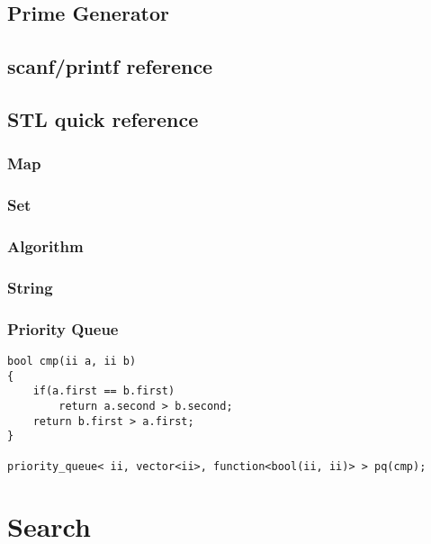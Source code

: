 \documentclass[10pt,oneside]{article}
\begin{document}
\begin{landscape}
\begin{multicols}{2}


\subsection{Prime Generator}


\subsection{scanf/printf reference}


\subsection{STL quick reference}

\subsubsection{Map}


\subsubsection{Set}


\subsubsection{Algorithm}


\subsubsection{String}

\subsubsection{Priority Queue}

\begin{lstlisting}
bool cmp(ii a, ii b)
{
    if(a.first == b.first)
		return a.second > b.second;
    return b.first > a.first;
}

priority_queue< ii, vector<ii>, function<bool(ii, ii)> > pq(cmp);
\end{lstlisting}


\section{Search}


\end{multicols}
\end{landscape}
\end{document}
